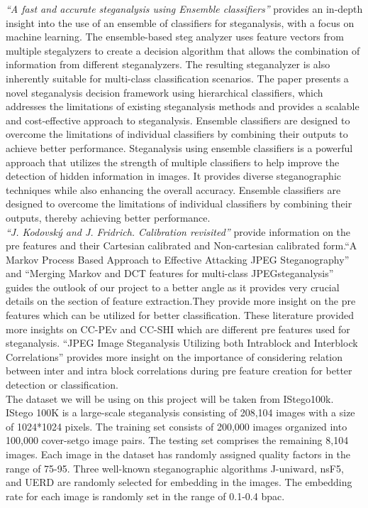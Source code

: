 \textit{``A fast and accurate steganalysis using Ensemble classifiers''}\cite{6} provides an in-depth insight into the use of an ensemble of classifiers for steganalysis, with a focus on machine learning. The ensemble-based steg analyzer uses feature vectors from multiple stegalyzers to create a decision algorithm that allows the combination of information from different steganalyzers. The resulting steganalyzer is also inherently suitable for multi-class classification scenarios. The paper presents a novel steganalysis decision framework using hierarchical classifiers, which addresses the limitations of existing steganalysis methods and provides a scalable and cost-effective approach to steganalysis. Ensemble classifiers are designed to overcome the limitations of individual classifiers by combining their outputs to achieve better performance. Steganalysis using ensemble classifiers is a powerful approach that utilizes the strength of multiple classifiers to help improve the detection of hidden information in images. It provides diverse steganographic techniques while also enhancing the overall accuracy. Ensemble classifiers are designed to overcome the limitations of individual classifiers by combining their outputs, thereby achieving better performance.\\
\textit{``J. Kodovský and J. Fridrich. Calibration revisited''}\cite{9} provide information on the pre features and their Cartesian calibrated and Non-cartesian calibrated form.``A Markov Process Based Approach to Effective Attacking JPEG Steganography''\cite{10} and ``Merging Markov and DCT features for multi-class JPEGsteganalysis''\cite{11}  guides the outlook of our project to a better angle as it provides very crucial details on the section of feature extraction.They provide more insight on the pre features which can be utilized for better classification. These literature provided more insights on CC-PEv and CC-SHI which are different pre features used for steganalysis. “JPEG Image Steganalysis Utilizing both Intrablock and Interblock Correlations”  provides more insight on the importance of considering relation between inter and intra block correlations during pre feature creation for better detection or classification. \\
The dataset we will be using on this project will be taken from IStego100k\cite{7}. IStego 100K is a large-scale steganalysis consisting of 208,104 images with a size of 1024*1024 pixels. The training set consists of 200,000 images organized into 100,000 cover-setgo image pairs. The testing set comprises the remaining 8,104 images. Each image in the dataset has randomly assigned quality factors in the range of 75-95. Three well-known steganographic algorithms J-uniward, nsF5, and UERD\cite{22}\cite{12}\cite{13} are randomly selected for embedding in the images. The embedding rate for each image is randomly set in the range of 0.1-0.4 bpac.\\ 
